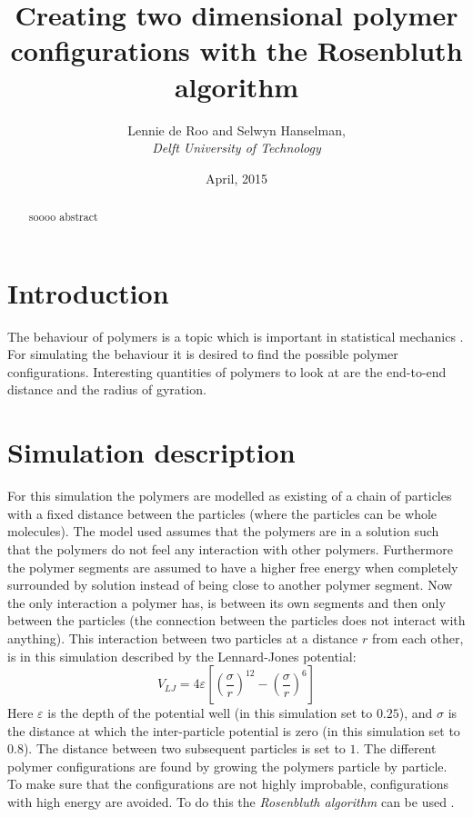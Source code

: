 \documentclass{article}
\begin{document}
\title{\textbf{Creating two dimensional polymer configurations with the Rosenbluth algorithm}}
\author{Lennie de Roo and Selwyn Hanselman, \\
 \emph{Delft University of Technology}}
\date{\normalsize{April, 2015}}
\maketitle 
\noindent \hrulefill
\begin{abstract}
{\color{blue}soooo abstract}
\end{abstract}
\hrulefill
\begin{multicols}{2}
\section*{Introduction}
The behaviour of polymers is a topic which is important in statistical mechanics \cite{Jos}\cite{Paper}.  For simulating the behaviour it is desired to find the possible polymer configurations. Interesting quantities of polymers to look at {\color{blue}are} the end-to-end distance {\color{blue} and the radius of gyration}.
\section*{Simulation description}
For this simulation the polymers are modelled as existing of a chain of particles with a fixed distance between the particles (where the particles can be whole molecules). The model used assumes that the polymers are in a solution such that the polymers do not feel any interaction with other polymers. Furthermore the polymer segments are assumed to have a higher free energy when completely surrounded by solution instead of being close to another polymer segment. Now the only interaction a polymer has, is between its own segments and then only between the particles (the connection between the particles does not interact with anything). This interaction between two particles at a distance $r$ from each other, is in this simulation described by the Lennard-Jones potential:
\begin{equation}
 V_{LJ}=4\varepsilon\left[\left(\frac{\sigma}{r}\right)^{ 12}-\left(\frac{\sigma}{r}\right)^{6}\right]
 \label{eq:LennardJones}
 \end{equation}
Here $\varepsilon$ is the depth of the potential well (in this simulation set to $0.25$), and $\sigma$ is the distance at which the inter-particle potential is zero (in this simulation set to $0.8$). The distance between two subsequent particles is set to $1$. The different polymer configurations are found by growing the polymers particle by particle. To make sure that the configurations are not highly improbable, configurations with high energy are avoided. To do this  the \emph{Rosenbluth algorithm} can be used \cite{Jos}. 

\end{multicols}
\end{document}
